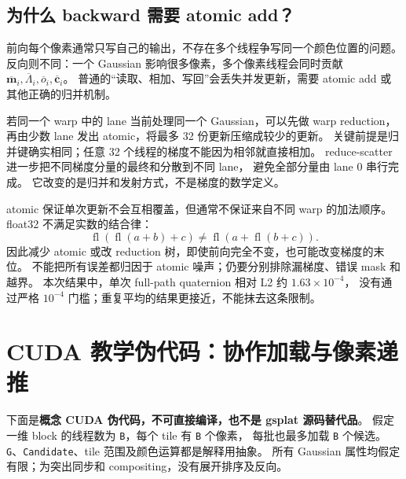 \subsection{为什么 backward 需要 atomic add？}

前向每个像素通常只写自己的输出，不存在多个线程争写同一个颜色位置的问题。
反向则不同：一个 Gaussian 影响很多像素，多个像素线程会同时贡献
$\overline{\mathbf m}_i,\overline\Lambda_i,\overline o_i,\overline{\mathbf c}_i$。
普通的“读取、相加、写回”会丢失并发更新，需要 atomic add 或其他正确的归并机制。

若同一个 warp 中的 lane 当前处理同一个 Gaussian，可以先做 warp reduction，
再由少数 lane 发出 atomic，将最多 32 份更新压缩成较少的更新。
关键前提是归并键确实相同；任意 32 个线程的梯度不能因为相邻就直接相加。
reduce-scatter 进一步把不同梯度分量的最终和分散到不同 lane，
避免全部分量由 lane 0 串行完成。
它改变的是归并和发射方式，不是梯度的数学定义。

atomic 保证单次更新不会互相覆盖，但通常不保证来自不同 warp 的加法顺序。
float32 不满足实数的结合律：
\begin{equation}
 \operatorname{fl}(\operatorname{fl}(a+b)+c)
 \neq\operatorname{fl}(a+\operatorname{fl}(b+c)).
\end{equation}
因此减少 atomic 或改 reduction 树，即使前向完全不变，也可能改变梯度的末位。
不能把所有误差都归因于 atomic 噪声；仍要分别排除漏梯度、错误 mask 和越界。
本次结果中，单次 full-path quaternion 相对 L2 约 $1.63\times10^{-4}$，
没有通过严格 $10^{-4}$ 门槛；重复平均的结果更接近，不能抹去这条限制。

\section{CUDA 教学伪代码：协作加载与像素递推}

下面是\textbf{概念 CUDA 伪代码，不可直接编译，也不是 gsplat 源码替代品}。
假定一维 block 的线程数为 \texttt{B}，每个 tile 有 \texttt{B} 个像素，
每批也最多加载 \texttt{B} 个候选。
\texttt{G}、\texttt{Candidate}、tile 范围及颜色运算都是解释用抽象。
所有 Gaussian 属性均假定有限；为突出同步和 compositing，没有展开排序及反向。

